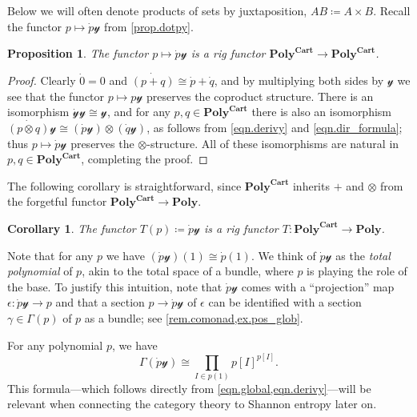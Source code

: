 \documentclass[11pt, one side, article]{memoir}
\theoremstyle{definition}
\theoremstyle{plain}
\newtheorem{proposition}[definitionx]{Proposition}
\newtheorem{corollary}[definitionx]{Corollary}
\newenvironment{example}
  {\pushQED{\qed}\renewcommand{\qedsymbol}{$\lozenge$}\examplex}
  {\popQED\endexamplex}
\newenvironment{remark}
  {\pushQED{\qed}\renewcommand{\qedsymbol}{$\lozenge$}\remarkx}
  {\popQED\endremarkx}
\newcommand{\Cat}[1]{\mathbf{#1}}%
\newcommand{\yon}{\mathcal{y}}
\newcommand{\poly}{\Cat{Poly}}
\newcommand{\polycart}{\poly^{\Cat{Cart}}}
\newcommand{\0}{\textsf{0}}
\newcommand{\1}{\tn{\textsf{1}}}
\newcommand{\T}{T}
\begin{document}
Below we will often denote products of sets by juxtaposition, $AB\coloneqq A\times B$. Recall the functor $p\mapsto\dot{p}\yon$ from \cref{prop.dotpy}.

\begin{proposition}
The functor $p\mapsto\dot{p}\yon$ is a rig functor $\polycart\to\polycart$. 
\end{proposition}
\begin{proof}
Clearly $\dot{0}=0$ and $\dot{(p+q)}\cong\dot{p}+\dot{q}$, and by multiplying both sides by $\yon$ we see that the functor $p\mapsto p\yon$ preserves the coproduct structure. There is an isomorphism $\dot{\yon}\yon\cong\yon$, and for any $p,q\in\polycart$ there is also an isomorphism $\dot{(p\otimes q)}\yon\cong(\dot{p}\yon)\otimes(\dot{q}\yon)$, as follows from \eqref{eqn.derivy} and \eqref{eqn.dir_formula}; thus $p\mapsto\dot{p}\yon$ preserves the $\otimes$-structure. All of these isomorphisms are natural in $p,q\in\polycart$, completing the proof.
\end{proof}

The following corollary is straightforward, since $\polycart$ inherits $+$ and $\otimes$ from the forgetful functor $\polycart\to\poly$.

\begin{corollary}\label{cor.D}
The functor $\T(p)\coloneqq\dot{p}\yon$ is a rig functor $\T\colon\polycart\to\poly$. 
\end{corollary}

\begin{remark}[Total polynomial]\label{rem.total}
Note that for any $p$ we have $(\dot{p}\yon)(1)\cong\dot{p}(1)$. We think of $\dot{p}\yon$ as the \emph{total polynomial} of $p$, akin to the total space of a bundle, where $p$ is playing the role of the base. To justify this intuition, note that $\dot{p}\yon$ comes with a ``projection'' map $\epsilon\colon\dot{p}\yon\to p$ and that a section $p\to \dot{p}\yon$ of $\epsilon$ can be identified with a section $\gamma\in\Gamma(p)$ of $p$ as a bundle; see \cref{rem.comonad,ex.pos_glob}.
\end{remark}


\begin{example}\label{ex.global_D}
For any polynomial $p$, we have
\[
\Gamma(\dot{p}\yon)\cong\prod_{I\in p(1)}p[I]^{p[I]}.
\]
This formula---which follows directly from \cref{eqn.global,eqn.derivy}---will be relevant when connecting the category theory to Shannon entropy later on. 
\end{example}
\end{document}
